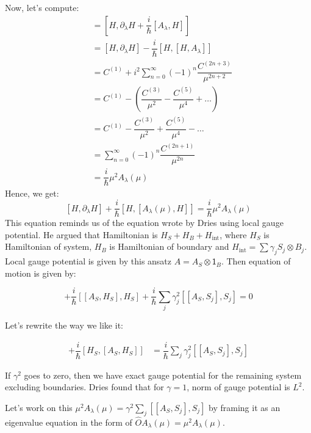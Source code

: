 \documentclass[11pt,a4paper]{article}
\begin{document}
Now, let's  compute:
\begin{align*}
[H, G_{\lambda}(\mu)]&=[H, \partial_{\lambda} H + \dfrac{i}{\hbar} [A_{\lambda}, H]] \\
&= [H, \partial_{\lambda} H] - \dfrac{i}{\hbar} [H,[ H, A_{\lambda}]]\\
&= C^{(1)} + i^2    \sum_{n=0}^{\infty}   (-1)^{n} \dfrac{ C^{(2n+3)}}{\mu^{2n+2}}\\
&= C^{(1)} -  (   \dfrac{ C^{(3)}}{\mu^{2}} - \dfrac{ C^{(5)}}{\mu^{4}} + \ldots)\\
&= C^{(1)} -   \dfrac{ C^{(3)}}{\mu^{2}} + \dfrac{ C^{(5)}}{\mu^{4}} - \ldots\\
&=\sum_{n=0}^{\infty}   (-1)^{n} \dfrac{ C^{(2n+1)}}{\mu^{2n}}\\
&= \dfrac{i}{\hbar} \mu^2 A_{\lambda} (\mu)
\end{align*}
Hence, we get:
 \begin{equation}
 \boxed{[H, \partial_{\lambda} H] + \dfrac{i}{\hbar}[H, [A_{\lambda}(\mu), H]]= \dfrac{i}{\hbar} \mu^2 A_{\lambda} (\mu)}
 \end{equation}
This equation reminds us of the equation wrote by Dries using local gauge potential. He argued that Hamiltonian is $H_S+ H_B + H_{\mbox{int}}$, where $H_S$ is Hamiltonian of system, $H_B$ is Hamiltonian of boundary and $H_{\mbox{int}}= \sum \gamma_j S_j \otimes B_j$. Local gauge potential is given by this ansatz $A= A_S \otimes \mathsf{1}_B$. Then equation of motion is given by:

\begin{equation}
 [\partial_{\lambda} H_S, H_S ] + \dfrac{i}{\hbar}[ [A_{S}, H_S], H_S] + \dfrac{i}{\hbar} \sum_j \gamma_j^2 [[A_{S}, S_j], S_j ]=0
 \end{equation}

Let's rewrite the way we like it:

\begin{align*}
 [ H_S,\partial_{\lambda} H_S ] + \dfrac{i}{\hbar}[ H_S, [A_{S}, H_S]] &= \dfrac{i}{\hbar} \sum_j \gamma_j^2 [[A_{S}, S_j], S_j ]
 \end{align*}

If $\gamma^2$ goes to zero, then we have exact gauge potential for the remaining system excluding boundaries. Dries found that for $\gamma=1$, norm of gauge potential is $L^2$. 

Let's work on this  $ \mu^2 A_{\lambda} (\mu)  =  \gamma^2 \sum_j  [[A_{S}, S_j], S_j ]$ by framing it as an eigenvalue equation in the form of $ \hat{O} A_{\lambda} (\mu) = \mu^2  A_{\lambda} (\mu)$.
\end{document}
